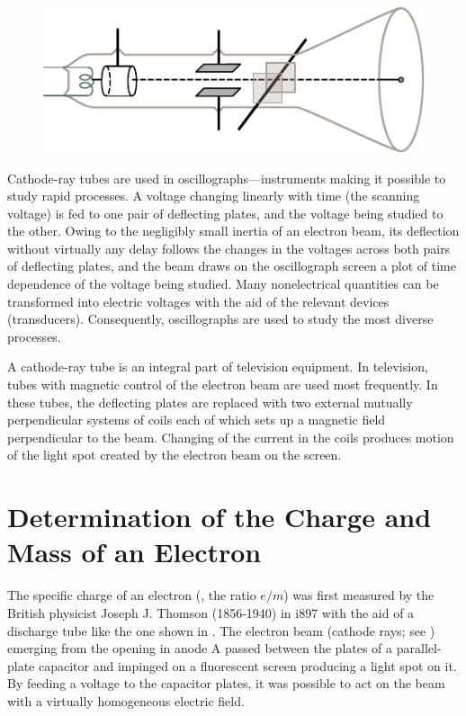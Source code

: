 \begin{figure}[t]
	\begin{center}
		\includegraphics[scale=1]{figures/ch_10/fig_10_5.pdf}
		\caption[]{}
		\label{fig:10_5}
	\end{center}
	\vspace{-0.8cm}
\end{figure}

Cathode-ray tubes are used in oscillographs---instruments making it possible to study rapid processes.
A voltage changing linearly with time (the scanning voltage) is fed to one pair of deflecting plates, and the voltage being studied to the other.
Owing to the negligibly small inertia of an electron beam, its deflection without virtually any delay follows the changes in the voltages across both pairs of deflecting plates, and the beam draws on the oscillograph screen a plot of time dependence of the voltage being studied.
Many nonelectrical quantities can be transformed into electric voltages with the aid of the relevant devices (transducers).
Consequently, oscillographs are used to study the most diverse processes.

A cathode-ray tube is an integral part of television equipment.
In television, tubes with magnetic control of the electron beam are used most frequently.
In these tubes, the deflecting plates are replaced with two external mutually perpendicular systems of coils each of which sets up a magnetic field perpendicular to the beam.
Changing of the current in the coils produces motion of the light spot created by the electron beam on the screen.

\section{Determination of the Charge and Mass
of an Electron}\label{sec:10_3}

The specific charge of an electron (\ie, the ratio $e/m$) was first measured by the British physicist Joseph J. Thomson (1856-1940) in i897 with the aid of a discharge tube like the one shown in .
The electron beam (cathode rays; see ) emerging from the opening in anode A passed between the plates of a parallel-plate capacitor and impinged on a fluorescent screen producing a light spot on it.
By feeding a voltage to the capacitor plates, it was possible to act on the beam with a virtually homogeneous electric field.

